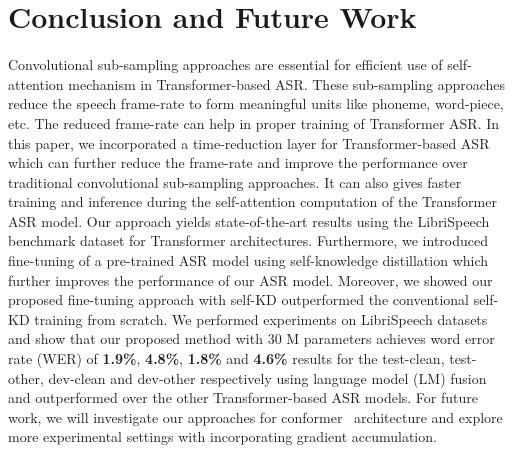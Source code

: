 \documentclass{article}
\begin{document}
        


\section{Conclusion and Future Work}
\label{sec:conclusion}
Convolutional sub-sampling approaches are essential for efficient use of self-attention mechanism in Transformer-based ASR. These sub-sampling approaches reduce the speech frame-rate to form meaningful units like phoneme, word-piece, etc. The reduced frame-rate can help in proper training of Transformer ASR. In this paper, we incorporated a time-reduction layer for Transformer-based ASR which can further reduce the frame-rate and improve the performance over traditional convolutional sub-sampling approaches. It can also gives faster training and inference during the self-attention computation of the Transformer ASR model. Our approach yields state-of-the-art results using the LibriSpeech benchmark dataset for Transformer  architectures. Furthermore, we introduced fine-tuning of a pre-trained ASR model using self-knowledge distillation which further improves the performance of our ASR model. Moreover, we showed our proposed fine-tuning approach with self-KD outperformed the conventional self-KD training from scratch. We performed experiments on LibriSpeech datasets and show that our proposed method with 30 M parameters achieves word error rate (WER) of \textbf{1.9\%}, \textbf{4.8\%}, \textbf{1.8\%} and \textbf{4.6\%} results for the test-clean, test-other, dev-clean and dev-other respectively using language model (LM) fusion and outperformed over the other Transformer-based ASR models. For future work, we will investigate our approaches for conformer~\citep{conformer} architecture and explore more experimental settings with incorporating gradient accumulation.






\end{document}
